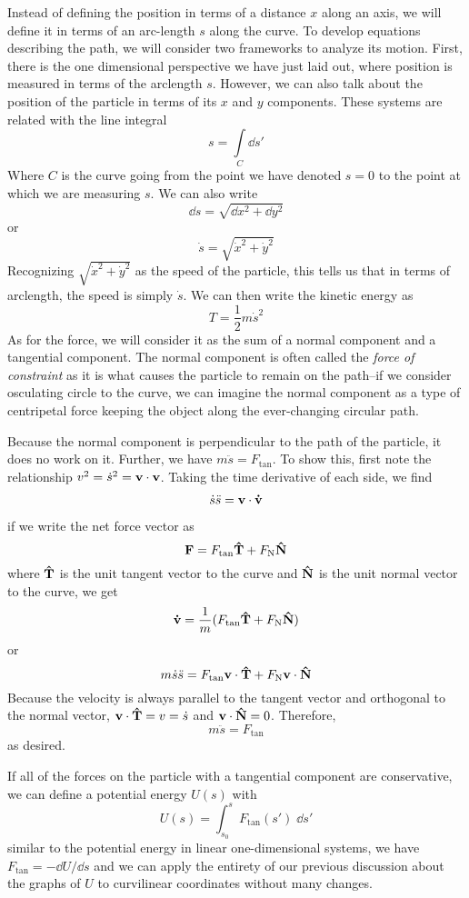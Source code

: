 Instead of defining the position in terms of a distance $x$ along an axis, we will define it in terms of an arc-length $s$ along the curve. To develop equations describing the path, we will consider two frameworks to analyze its motion. First, there is the one dimensional perspective we have just laid out, where position is measured in terms of the arclength $s$. However, we can also talk about the position of the particle in terms of its $x$ and $y$ components. These systems are related with the line integral 
\[ s = \int\limits_C \dd s'\]
Where $C$ is the curve going from the point we have denoted $s=0$ to the point at which we are measuring $s$. We can also write
 \[ \dd s = \sqrt{\dd x^2 + \dd y ^2} \]
 or
 \[ \dot s = \sqrt{\dot x^2 + \dot y^2}\]
 Recognizing $\sqrt{\dot x^2+\dot y^2}$ as the speed of the particle, this tells us that in terms of arclength, the speed is simply $\dot s$. We can then write the kinetic energy as
\[ T = \frac{1}{2}m\dot s^2\]
As for the force, we will consider it as the sum of a normal component and a tangential component. The normal component is often called the \textit{force of constraint} as it is what causes the particle to remain on the path--if we consider osculating circle to the curve, we can imagine the normal component as a type of centripetal force keeping the object along the ever-changing circular path. 

Because the normal component is perpendicular to the path of the particle, it does no work on it. Further, we have $m\ddot{s} = F_\text{tan}$. To show this, first note the relationship $v^2 = \dot s^2 = \mathbf{v} \cdot \mathbf{v}$. Taking the time derivative of each side, we find
\begin{align*}
    \dot{s}\ddot{s} = \mathbf{v} \cdot \mathbf{\dot v}
\end{align*}
if we write the net force vector as 
\[ \mathbf{F} = F_\text{tan}\mathbf{\hat{T}} + F_\text{N} \mathbf{\hat N}\]
where $\mathbf{\hat{T}}$ is the unit tangent vector to the curve and $\mathbf{\hat{N}}$ is the unit normal vector to the curve, we get
\[ \mathbf{\dot v} = \frac{1}{m} (F_\text{tan}\mathbf{\hat{T}} + F_\text{N} \mathbf{\hat N}) \]
or
\[ m\dot{s}\ddot{s} = F_\text{tan}\mathbf{v} \cdot \mathbf{\hat{T}} + F_\text{N} \mathbf{v}\cdot \mathbf{\hat N} \]
Because the velocity is always parallel to the tangent vector and orthogonal to the normal vector, $\mathbf{v}\cdot\mathbf{\hat T} = v = \dot s$ and $\mathbf{v}\cdot\mathbf{\hat N} = 0$. Therefore,
\[ m\ddot{s} = F_\text{tan}\]
as desired. 

If all of the forces on the particle with a tangential component are conservative, we can define a potential energy $U(s)$ with
\[ U(s) = \int_{s_0}^s F_\text{tan}(s')\; \dd s'\]
similar to the potential energy in linear one-dimensional systems, we have $F_\text{tan} = -\dd U/\dd s$ and we can apply the entirety of our previous discussion about the graphs of $U$ to curvilinear coordinates without many changes.

